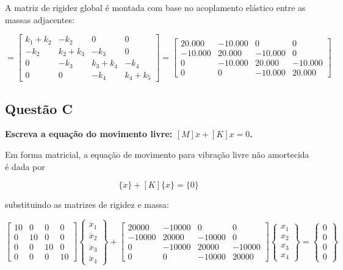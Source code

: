 \documentclass[a4paper, 12pt]{article}
\begin{document}
A matriz de rigidez global é montada com base no acoplamento elástico entre as massas adjacentes:

\begin{equation}
[K] =
\begin{bmatrix}
k_1 + k_2 & -k_2 & 0 & 0 \\
-k_2 & k_2 + k_3 & -k_3 & 0 \\
0 & -k_3 & k_3 + k_4 & -k_4 \\
0 & 0 & -k_4 & k_4 + k_5
\end{bmatrix}
=
\begin{bmatrix}
20.000 & -10.000 & 0 & 0 \\
-10.000 & 20.000 & -10.000 & 0 \\
0 & -10.000 & 20.000 & -10.000 \\
0 & 0 & -10.000 & 20.000
\end{bmatrix}
\label{eq:matriz_rigidez}
\end{equation}

\subsection{Questão C}

\textbf{Escreva a equação do movimento livre: $[M]{\ddot{x}} + [K]{x} = {0}$.}

Em forma matricial, a equação de movimento para vibração livre não amortecida é dada por

\begin{equation}
[M]\{\ddot{x}\} + [K]\{x\} = \{0\}
\label{eq:equacao_movimento}
\end{equation}

substituindo as matrizes de rigidez e massa:

\begin{equation}
\begin{bmatrix}
10 & 0 & 0 & 0\\
0 & 10 & 0 & 0\\
0 & 0 & 10 & 0\\
0 & 0 & 0 & 10
\end{bmatrix}
\begin{Bmatrix}
\ddot{x}_1\\
\ddot{x}_2\\
\ddot{x}_3\\
\ddot{x}_4
\end{Bmatrix}
+
\begin{bmatrix}
20000 & -10000 & 0 & 0\\
-10000 & 20000 & -10000 & 0\\
0 & -10000 & 20000 & -10000\\
0 & 0 & -10000 & 20000
\end{bmatrix}
\begin{Bmatrix}
x_1\\
x_2\\
x_3\\
x_4
\end{Bmatrix}
=
\begin{Bmatrix}
0\\
0\\
0\\
0
\end{Bmatrix}
\label{eq:movimento_livre}
\end{equation}
\end{document}
